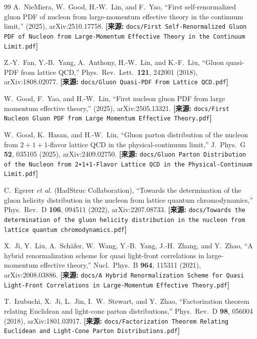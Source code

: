 \documentclass[12pt,a4paper]{ctexart}
\theoremstyle{definition}
\begin{document}
\begin{thebibliography}{99}
A.~NieMiera, W.~Good, H.-W.~Lin, and F.~Yao,
``First self-renormalized gluon PDF of nucleon from large-momentum effective theory in the continuum limit,''
(2025), arXiv:2510.17758.
\quad\textbf{[来源:} \texttt{docs/First Self-Renormalized Gluon PDF of Nucleon from Large-Momentum Effective Theory in the Continuum Limit.pdf}\textbf{]}

Z.-Y.~Fan, Y.-B.~Yang, A.~Anthony, H.-W.~Lin, and K.-F.~Liu,
``Gluon quasi-PDF from lattice QCD,''
Phys.\ Rev.\ Lett.\ \textbf{121}, 242001 (2018), arXiv:1808.02077.
\quad\textbf{[来源:} \texttt{docs/Gluon Quasi-PDF From Lattice QCD.pdf}\textbf{]}

W.~Good, F.~Yao, and H.-W.~Lin,
``First nucleon gluon PDF from large momentum effective theory,''
(2025), arXiv:2505.13321.
\quad\textbf{[来源:} \texttt{docs/First Nucleon Gluon PDF from Large Momentum Effective Theory.pdf}\textbf{]}

W.~Good, K.~Hasan, and H.-W.~Lin,
``Gluon parton distribution of the nucleon from $2+1+1$-flavor lattice QCD in the physical-continuum limit,''
J.\ Phys.\ G \textbf{52}, 035105 (2025), arXiv:2409.02750.
\quad\textbf{[来源:} \texttt{docs/Gluon Parton Distribution of the Nucleon from 2+1+1-Flavor Lattice QCD in the Physical-Continuum Limit.pdf}\textbf{]}

C.~Egerer \textit{et al.} (HadStruc Collaboration),
``Towards the determination of the gluon helicity distribution in the nucleon from lattice quantum chromodynamics,''
Phys.\ Rev.\ D \textbf{106}, 094511 (2022), arXiv:2207.08733.
\quad\textbf{[来源:} \texttt{docs/Towards the determination of the gluon helicity distribution in the nucleon from lattice quantum chromodynamics.pdf}\textbf{]}

X.~Ji, Y.~Liu, A.~Sch\"afer, W.~Wang, Y.-B.~Yang, J.-H.~Zhang, and Y.~Zhao,
``A hybrid renormalization scheme for quasi light-front correlations in large-momentum effective theory,''
Nucl.\ Phys.\ B \textbf{964}, 115311 (2021), arXiv:2008.03886.
\quad\textbf{[来源:} \texttt{docs/A Hybrid Renormalization Scheme for Quasi Light-Front Correlations in Large-Momentum Effective Theory.pdf}\textbf{]}

T.~Izubuchi, X.~Ji, L.~Jin, I.~W.~Stewart, and Y.~Zhao,
``Factorization theorem relating Euclidean and light-cone parton distributions,''
Phys.\ Rev.\ D \textbf{98}, 056004 (2018), arXiv:1801.03917.
\quad\textbf{[来源:} \texttt{docs/Factorization Theorem Relating Euclidean and Light-Cone Parton Distributions.pdf}\textbf{]}


\end{thebibliography}
\end{document}
